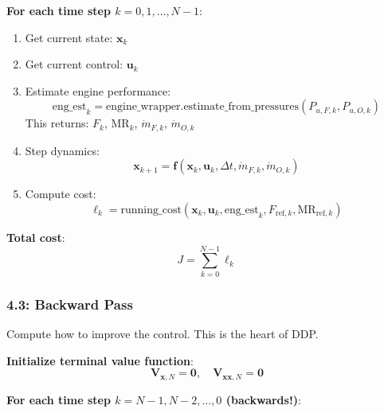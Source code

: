 \documentclass[11pt,a4paper]{article}
\begin{document}
\textbf{For each time step $k = 0, 1, \ldots, N-1$}:
\begin{enumerate}
    \item Get current state: $\mathbf{x}_k$
    \item Get current control: $\mathbf{u}_k$
    \item Estimate engine performance:
    \begin{equation}
    \text{eng\_est}_k = \text{engine\_wrapper.estimate\_from\_pressures}(P_{u,F,k}, P_{u,O,k})
    \end{equation}
    This returns: $F_k$, $\text{MR}_k$, $\dot{m}_{F,k}$, $\dot{m}_{O,k}$
    
    \item Step dynamics:
    \begin{equation}
    \mathbf{x}_{k+1} = \mathbf{f}(\mathbf{x}_k, \mathbf{u}_k, \Delta t, \dot{m}_{F,k}, \dot{m}_{O,k})
    \end{equation}
    
    \item Compute cost:
    \begin{equation}
    \ell_k = \text{running\_cost}(\mathbf{x}_k, \mathbf{u}_k, \text{eng\_est}_k, F_{\text{ref},k}, \text{MR}_{\text{ref},k})
    \end{equation}
\end{enumerate}

\textbf{Total cost}:
\begin{equation}
J = \sum_{k=0}^{N-1} \ell_k
\end{equation}

\subsubsection{4.3: Backward Pass}

Compute how to improve the control. This is the heart of DDP.

\textbf{Initialize terminal value function}:
\begin{equation}
\mathbf{V}_{\mathbf{x},N} = \mathbf{0}, \quad \mathbf{V}_{\mathbf{xx},N} = \mathbf{0}
\end{equation}

\textbf{For each time step $k = N-1, N-2, \ldots, 0$ (backwards!)}:
\end{document}
